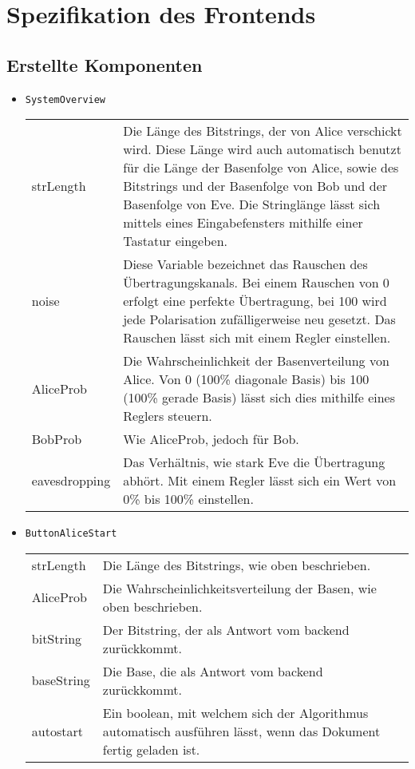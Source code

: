 \section{Spezifikation des Frontends}
\subsection{Erstellte Komponenten}
\begin{itemize}
\item \texttt{SystemOverview} \\[3mm]
\begin{tabularx}{\textwidth}{p{4.5cm}p{9.5cm}} 
strLength & Die Länge des Bitstrings, der von Alice verschickt wird. Diese Länge wird auch automatisch benutzt für die Länge der Basenfolge von Alice, sowie des Bitstrings und der Basenfolge von Bob und der Basenfolge von Eve. Die Stringlänge lässt sich mittels eines Eingabefensters mithilfe einer Tastatur eingeben. \\
noise & Diese Variable bezeichnet das Rauschen des Übertragungskanals. Bei einem Rauschen von 0 erfolgt eine perfekte Übertragung, bei 100 wird jede Polarisation zufälligerweise neu gesetzt. Das Rauschen lässt sich mit einem Regler einstellen. \\
AliceProb & Die Wahrscheinlichkeit der Basenverteilung von Alice. Von 0 (100\% diagonale Basis) bis 100 (100\% gerade Basis) lässt sich dies mithilfe eines Reglers steuern. \\
BobProb & Wie AliceProb, jedoch für Bob. \\
eavesdropping & Das Verhältnis, wie stark Eve die Übertragung abhört. Mit einem Regler lässt sich ein Wert von 0\% bis 100\% einstellen.
\end{tabularx}
\item \texttt{ButtonAliceStart}\\[3mm]
\begin{tabularx}{\textwidth}{p{4.5cm}p{9.5cm}} 
strLength & Die Länge des Bitstrings, wie oben beschrieben. \\
AliceProb & Die Wahrscheinlichkeitsverteilung der Basen, wie oben beschrieben. \\
bitString & Der Bitstring, der als Antwort vom backend zurückkommt. \\
baseString &  Die Base, die als Antwort vom backend zurückkommt. \\
autostart & Ein boolean, mit welchem sich der Algorithmus automatisch ausführen lässt, wenn das Dokument fertig geladen ist. \\

\end{tabularx}
\end{itemize}
